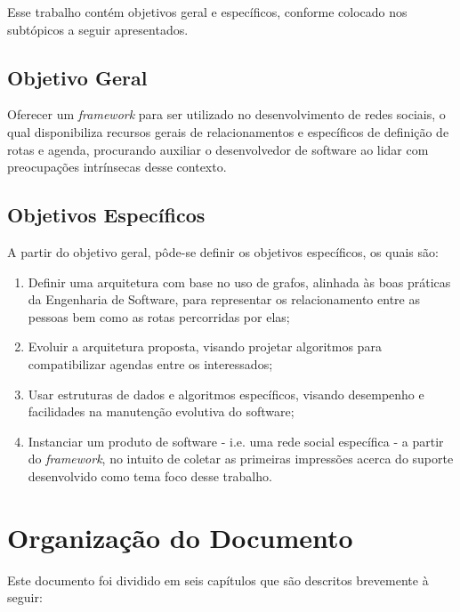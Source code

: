 Esse trabalho contém objetivos geral e específicos, conforme colocado nos subtópicos a seguir apresentados.

\subsection{Objetivo Geral}

Oferecer um \textit{framework} para ser utilizado no desenvolvimento de redes sociais, o qual disponibiliza recursos gerais de relacionamentos e específicos de definição de rotas e agenda, procurando auxiliar o desenvolvedor de software ao lidar com preocupações intrínsecas desse contexto.

\subsection{Objetivos Específicos}

A partir do objetivo geral, pôde-se definir os objetivos específicos, os quais são:

\begin{enumerate}
	\item Definir uma arquitetura com base no uso de grafos, alinhada às boas práticas da Engenharia de Software, para representar os relacionamento entre as pessoas bem como as rotas percorridas por elas;
	\item Evoluir a arquitetura proposta, visando projetar algoritmos para compatibilizar agendas entre os interessados;
	\item Usar estruturas de dados e algoritmos específicos, visando desempenho e facilidades na manutenção evolutiva do software;
	\item Instanciar um produto de software - i.e. uma rede social específica - a partir do \textit{framework}, no intuito de coletar as primeiras impressões acerca do suporte desenvolvido como tema foco desse trabalho.
\end{enumerate}

\section{Organização do Documento}

Este documento foi dividido em seis capítulos que são descritos brevemente à seguir:

